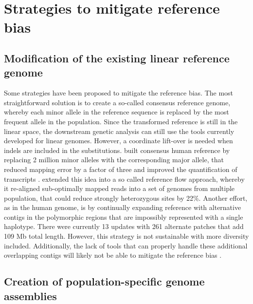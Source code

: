\documentclass[../main.tex]{subfiles}
\begin{document}
\section{Strategies to mitigate reference bias}

\subsection{Modification of the existing linear reference genome}

Some strategies have been proposed to mitigate the reference bias. The most straightforward solution is to create a so-called consensus reference genome, whereby each minor allele in the reference sequence is replaced by the most frequent allele in the population. Since the transformed reference is still in the linear space, the downstream genetic analysis can still use the tools currently developed for linear genomes. However, a coordinate lift-over is needed when indels are included in the substitutions. \citet{ballouz2019time} built consensus human reference by replacing 2 million minor alleles with the corresponding major allele, that reduced mapping error by a factor of three and improved the quantification of transcripts \citep{kaminow2020virtue}. \citet{chen2021reference} extended this idea into a so called reference flow approach, whereby it re-aligned sub-optimally mapped reads into a set of genomes from multiple population, that could reduce strongly heterozygous sites by 22\%. Another effort, as in the human genome, is by continually expanding reference with alternative contigs in the polymorphic regions that are impossibly represented with a single haplotype. There were currently 13 updates with 261 alternate patches that add 109 Mb total length. However, this strategy is not sustainable with more diversity included. Additionally, the lack of tools that can properly handle these additional overlapping contigs will likely not be able to mitigate the reference bias \citep{sherman2020pan}. 

\subsection{Creation of population-specific genome assemblies}
\end{document}
